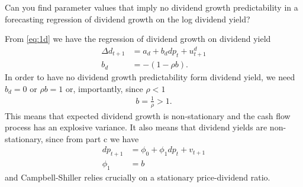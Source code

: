 \begin{answer}[Part h]
Can you find parameter values that imply no dividend growth predictability in a forecasting regression of dividend growth on the log dividend yield?
\end{answer}
From \eqref{eq:1d} we have the regression of dividend growth on dividend yield
\begin{align}
    \Delta d_{t+1} &= a_d + b_d dp_t + u_{t+1}^d \\
     b_d &= -(1-\rho b).
\end{align}
In order to have no dividend growth predictability form dividend yield, we need $b_d=0$ or $\rho b=1$ or, importantly, since $\rho <1$
\begin{align}
b=\frac{1}{\rho}>1.
\end{align}
This means that expected dividend growth is non-stationary and the cash flow process has an explosive variance. It also means that dividend yields are non-stationary, since from part c we have
\begin{align}
    dp_{t+1} &= \phi_0 + \phi_1 dp_t + v_{t+1} \\
    \phi_1 &= b
\end{align}
and Campbell-Shiller relies crucially on a stationary price-dividend ratio.
